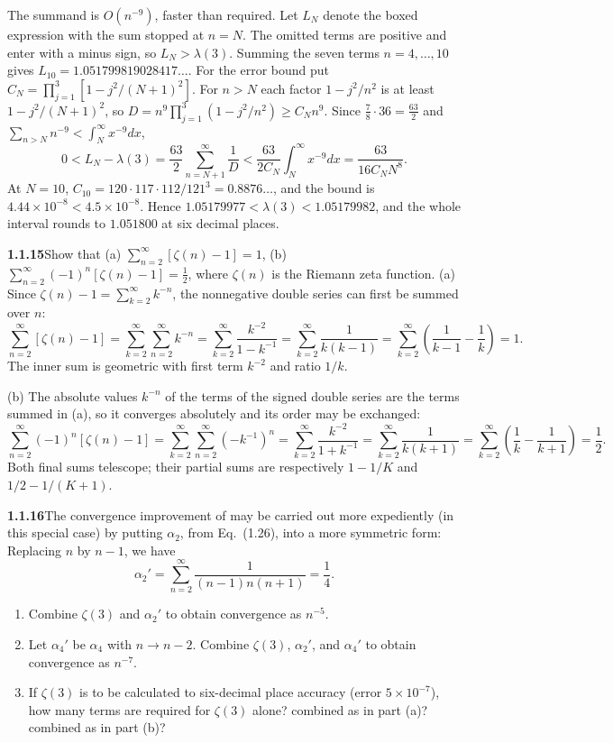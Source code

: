 The summand is $O(n^{-9})$, faster than required. Let $L_N$ denote the
boxed expression with the sum stopped at $n=N$. The omitted terms are
positive and enter with a minus sign, so $L_N>\lambda(3)$. Summing the
seven terms $n=4,\ldots,10$ gives $L_{10}=1.051799819028417\ldots$.
For the error bound put $C_N=\prod_{j=1}^3[1-j^2/(N+1)^2]$. For $n>N$
each factor $1-j^2/n^2$ is at least $1-j^2/(N+1)^2$, so
$D=n^9\prod_{j=1}^3(1-j^2/n^2)\ge C_Nn^9$. Since
$\frac78\cdot36=\frac{63}2$ and $\sum_{n>N}n^{-9}<\int_N^\infty x^{-9}dx$,
\[
 0<L_N-\lambda(3)=\frac{63}2\sum_{n=N+1}^\infty\frac1D
 <\frac{63}{2C_N}\int_N^\infty x^{-9}dx
 =\frac{63}{16C_N N^8}.
\]
At $N=10$, $C_{10}=120\cdot117\cdot112/121^3=0.8876\ldots$, and the bound
is $4.44\times10^{-8}<4.5\times10^{-8}$. Hence
$1.05179977<\lambda(3)<1.05179982$, and the whole interval rounds to
$\boxed{1.051800}$ at six decimal places.


\par\bigskip
\noindent\textbf{1.1.15}\quad Show that (a)
$\sum_{n=2}^{\infty}[\zeta(n)-1]=1$, (b)
$\sum_{n=2}^{\infty}(-1)^{n}[\zeta(n)-1]=\frac{1}{2}$, where $\zeta(n)$ is the
Riemann zeta function.
\solution
(a) Since $\zeta(n)-1=\sum_{k=2}^\infty k^{-n}$, the nonnegative double
series can first be summed over $n$:
\[
 \sum_{n=2}^\infty[\zeta(n)-1]
 =\sum_{k=2}^\infty\sum_{n=2}^\infty k^{-n}
 =\sum_{k=2}^\infty\frac{k^{-2}}{1-k^{-1}}
 =\sum_{k=2}^\infty\frac1{k(k-1)}
 =\sum_{k=2}^\infty\left(\frac1{k-1}-\frac1k\right)=1.
\]
The inner sum is geometric with first term $k^{-2}$ and ratio $1/k$.

(b) The absolute values $k^{-n}$ of the terms of the signed double series
are the terms summed in (a), so it converges absolutely and its order
may be exchanged:
\[
 \sum_{n=2}^\infty(-1)^n[\zeta(n)-1]
 =\sum_{k=2}^\infty\sum_{n=2}^\infty(-k^{-1})^n
 =\sum_{k=2}^\infty\frac{k^{-2}}{1+k^{-1}}
 =\sum_{k=2}^\infty\frac1{k(k+1)}
 =\sum_{k=2}^\infty\left(\frac1k-\frac1{k+1}\right)=\frac12.
\]
Both final sums telescope; their partial sums are respectively
$1-1/K$ and $1/2-1/(K+1)$.


\par\bigskip
\noindent\textbf{1.1.16}\quad The convergence improvement of  may be
carried out more expediently (in this special case) by putting $\alpha_{2}$,
from Eq.~(1.26), into a more symmetric form: Replacing $n$ by $n-1$, we have
\[
\alpha_{2}'=\sum_{n=2}^{\infty}\frac{1}{(n-1)n(n+1)}=\frac{1}{4}.
\]
\begin{enumerate}
\item[(a)] Combine $\zeta(3)$ and $\alpha_{2}'$ to obtain convergence as
  $n^{-5}$.
\item[(b)] Let $\alpha_{4}'$ be $\alpha_{4}$ with $n\to n-2$. Combine
  $\zeta(3)$, $\alpha_{2}'$, and $\alpha_{4}'$ to obtain convergence as
  $n^{-7}$.
\item[(c)] If $\zeta(3)$ is to be calculated to six-decimal place accuracy
  (error $5\times10^{-7}$), how many terms are required for $\zeta(3)$ alone?
  combined as in part (a)? combined as in part (b)?
\end{enumerate}

